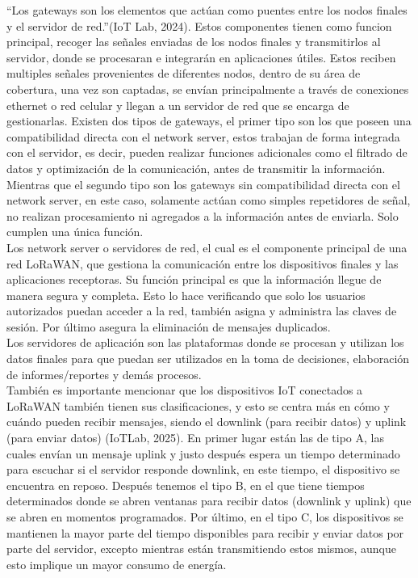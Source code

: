 \documentclass[12pt,a4paper]{article}
\begin{document}
	“Los gateways son los elementos que actúan como puentes entre los nodos finales y el servidor de red.”(IoT Lab, 2024). Estos componentes tienen como funcion principal, recoger las señales enviadas de los nodos finales y transmitirlos al servidor, donde se procesaran e integrarán en aplicaciones útiles. Estos reciben multiples señales provenientes de diferentes nodos, dentro de su área de cobertura, una vez son captadas, se envían principalmente a través de conexiones ethernet o red celular y llegan a un servidor de red que se encarga de gestionarlas. Existen dos tipos de gateways, el primer tipo son los que poseen una compatibilidad directa con el network server, estos trabajan de forma integrada con el servidor, es decir, pueden realizar funciones adicionales como el filtrado de datos y optimización de la comunicación, antes de transmitir la información. Mientras que el segundo tipo son los gateways sin compatibilidad directa con el network server, en este caso, solamente actúan como simples repetidores de señal, no realizan procesamiento ni agregados a la información antes de enviarla. Solo cumplen una única función.\\
	
	Los network server o servidores de red, el cual es el componente principal de una red LoRaWAN, que gestiona la comunicación entre los dispositivos finales y las aplicaciones receptoras. Su función principal es que la información llegue de manera segura y completa. Esto lo hace verificando que solo los usuarios autorizados puedan acceder a la red, también asigna y administra las claves de sesión. Por último asegura la eliminación de mensajes duplicados.\\
	
	Los servidores de aplicación son las plataformas donde se procesan y utilizan los datos finales para que puedan ser utilizados en la toma de decisiones, elaboración de  informes/reportes y demás procesos.\\
	
	También es importante mencionar que los dispositivos IoT conectados a LoRaWAN también tienen sus clasificaciones, y esto se centra más en cómo y cuándo pueden recibir mensajes, siendo el downlink (para recibir datos) y uplink (para enviar datos) (IoTLab, 2025). En primer lugar están las de tipo A, las cuales envían un mensaje uplink y justo después espera un tiempo determinado para escuchar si el servidor responde downlink, en este tiempo, el dispositivo se encuentra en reposo. Después tenemos el tipo B, en el que tiene tiempos determinados donde se abren ventanas para recibir datos (downlink y uplink) que se abren en momentos programados. Por último, en el tipo C, los dispositivos se mantienen la mayor parte del tiempo disponibles para recibir y enviar datos por parte del servidor, excepto mientras están transmitiendo estos mismos, aunque esto implique un mayor consumo de energía.\\
	
\end{document}
